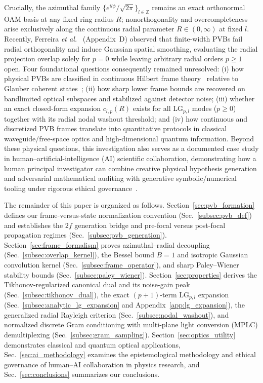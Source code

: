 \documentclass[aps,pra,onecolumn,notitlepage,11pt,tightenlines,amsmath,amssymb,floatfix,longbibliography]{revtex4-2}
\begin{document}
Crucially, the azimuthal family $\{e^{il\phi}/\sqrt{2\pi}\}_{l\in\mathbb{Z}}$ remains an exact orthonormal OAM basis at any fixed ring radius $R$; nonorthogonality and overcompleteness arise exclusively along the continuous radial parameter $R \in (0,\infty)$ at fixed $l$. Recently, Ferreira \emph{et al.}~\cite{Ferreira2026} (Appendix~D) observed that finite-width PVBs fail radial orthogonality and induce Gaussian spatial smoothing, evaluating the radial projection overlap solely for $p = 0$ while leaving arbitrary radial orders $p \ge 1$ open. Four foundational questions consequently remained unresolved: (i) how physical PVBs are classified in continuous Hilbert frame theory~\cite{Duffin1952,Daubechies1990,Ali1993,Christensen2016} relative to Glauber coherent states~\cite{Klauder1985,Perelomov1986,Gazeau2009}; (ii) how sharp lower frame bounds are recovered on bandlimited optical subspaces and stabilized against detector noise; (iii) whether an exact closed-form expansion $c_{l,p}(R)$ exists for all $\mathrm{LG}_{p,l}$ modes ($p \ge 0$) together with its radial nodal washout threshold; and (iv) how continuous and discretized PVB frames translate into quantitative protocols in classical waveguide/free-space optics and high-dimensional quantum information. Beyond these physical questions, this investigation also serves as a documented case study in human--artificial-intelligence (AI) scientific collaboration, demonstrating how a human principal investigator can combine creative physical hypothesis generation and adversarial mathematical auditing with generative symbolic/numerical tooling under rigorous ethical governance~\cite{Messeri2024,OToole2024,Chandra2026TheoPhysEval}.

The remainder of this paper is organized as follows. Section~\ref{sec:pvb_formation} defines our frame-versus-state normalization convention (Sec.~\ref{subsec:pvb_def}) and establishes the $2f$ generation bridge and pre-focal versus post-focal propagation regimes (Sec.~\ref{subsec:pvb_generation}). Section~\ref{sec:frame_formalism} proves azimuthal--radial decoupling (Sec.~\ref{subsec:overlap_kernel}), the Bessel bound $B=1$ and isotropic Gaussian convolution kernel (Sec.~\ref{subsec:frame_operator}), and sharp Paley--Wiener stability bounds (Sec.~\ref{subsec:paley_wiener}). Section~\ref{sec:properties} derives the Tikhonov-regularized canonical dual and its noise-gain peak (Sec.~\ref{subsec:tikhonov_dual}), the exact $(p+1)$-term $\mathrm{LG}_{p,l}$ expansion (Sec.~\ref{subsec:analytic_lg_expansion} and Appendix~\ref{app:lg_expansion}), the generalized radial Rayleigh criterion (Sec.~\ref{subsec:nodal_washout}), and normalized discrete Gram conditioning with multi-plane light conversion (MPLC) demultiplexing (Sec.~\ref{subsec:gram_sampling}). Section~\ref{sec:optics_utility} demonstrates classical and quantum optical applications, Sec.~\ref{sec:ai_methodology} examines the epistemological methodology and ethical governance of human--AI collaboration in physics research, and Sec.~\ref{sec:conclusions} summarizes our conclusions.
\end{document}
